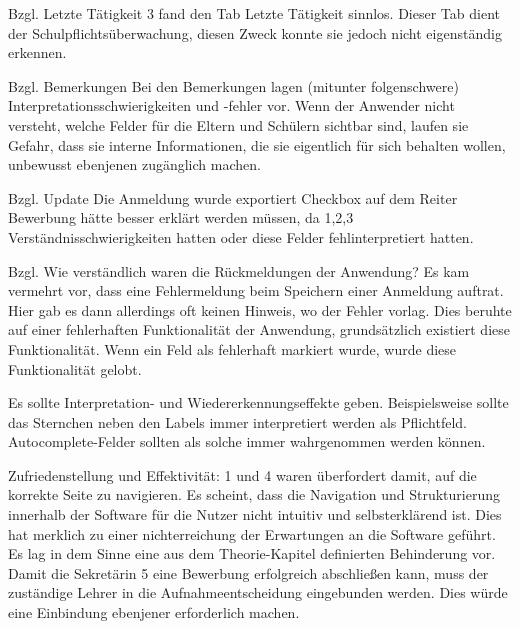 Bzgl. Letzte Tätigkeit
3 fand den Tab \glqq Letzte Tätigkeit\grqq{} \glqq sinnlos\grqq{}. Dieser Tab dient der Schulpflichtsüberwachung, diesen Zweck konnte sie jedoch nicht eigenständig erkennen.

Bzgl. Bemerkungen
Bei den Bemerkungen lagen (mitunter folgenschwere) Interpretationsschwierigkeiten und -fehler vor. Wenn der Anwender nicht versteht, welche Felder für die Eltern und Schülern sichtbar sind, laufen sie Gefahr, dass sie interne Informationen, die sie eigentlich für sich behalten wollen, unbewusst ebenjenen zugänglich machen. 

Bzgl. Update
Die \glqq Anmeldung wurde exportiert\grqq{} Checkbox auf dem Reiter \glqq Bewerbung\grqq{} hätte besser erklärt werden müssen, da 1,2,3 Verständnisschwierigkeiten hatten oder diese Felder fehlinterpretiert hatten.

Bzgl. Wie verständlich waren die Rückmeldungen der Anwendung?
Es kam vermehrt vor, dass eine Fehlermeldung beim Speichern einer Anmeldung auftrat. Hier gab es dann allerdings oft keinen Hinweis, wo der Fehler vorlag. Dies beruhte auf einer fehlerhaften Funktionalität der Anwendung, grundsätzlich existiert diese Funktionalität. Wenn ein Feld als fehlerhaft markiert wurde, wurde diese Funktionalität gelobt.

Es sollte Interpretation- und Wiedererkennungseffekte geben. Beispielsweise sollte das Sternchen neben den Labels immer interpretiert werden als Pflichtfeld. Autocomplete-Felder sollten als solche immer wahrgenommen werden können.

Zufriedenstellung und Effektivität:
1 und 4 waren überfordert damit, auf die korrekte Seite zu navigieren. Es scheint, dass die Navigation und Strukturierung innerhalb der Software für die Nutzer nicht intuitiv und selbsterklärend ist. Dies hat merklich zu einer nichterreichung der Erwartungen an die Software geführt. Es lag in dem Sinne eine aus dem Theorie-Kapitel definierten Behinderung vor. 
Damit die Sekretärin 5 eine Bewerbung erfolgreich abschließen kann, muss der zuständige Lehrer in die Aufnahmeentscheidung eingebunden werden. Dies würde eine Einbindung ebenjener erforderlich machen.

